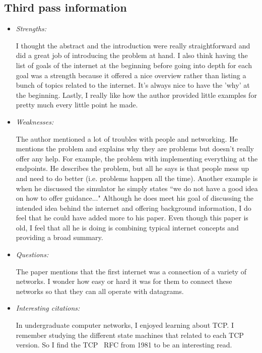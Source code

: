 \documentclass[letterpaper,twocolumn,10pt]{article}
\begin{document}
\subsection{Third pass information}
\label{sec:third}
\begin{itemize}

\item {\it Strengths:} 

I thought the abstract and the introduction were really straightforward and did a great
job of introducing the problem at hand. I also think having the list of goals of the internet at the beginning before 
going into depth for each goal was a strength because it offered a nice overview rather than listing a bunch of
topics related to the internet. It's always nice to have the 'why' at the beginning. Lastly, I really like how the author
provided little examples for pretty much every little point he made. 

\item {\it Weaknesses:} 

The author mentioned a lot of troubles with people and networking. He mentions the problem and explains why 
they are problems but doesn't really offer any help. For example, the problem with implementing everything at the
endpoints. He describes the problem, but all he says is that people mess up and need to do better (i.e. problems 
happen all the time). Another example is when he discussed the simulator he simply states ``we do not have a 
good idea on how to offer guidance..." Although he does meet his goal of discussing the intended idea behind the internet
and offering background information, I do feel that he could have added more to his paper. Even though this paper is 
old, I feel that all he is doing is combining typical internet concepts and providing a broad summary. 

\item {\it Questions:} 

The paper mentions that the first internet was a connection of a variety of networks. I wonder how easy or hard it
was for them to connect these networks so that they can all operate with datagrams. 

\item {\it Interesting citations:} 

In undergraduate computer networks, I enjoyed learning about TCP. I remember studying the different 
state machines that related to each TCP version. So I find the TCP~\cite{tcp} RFC from 1981 to be an 
interesting read. 


\end{itemize}
\end{document}
